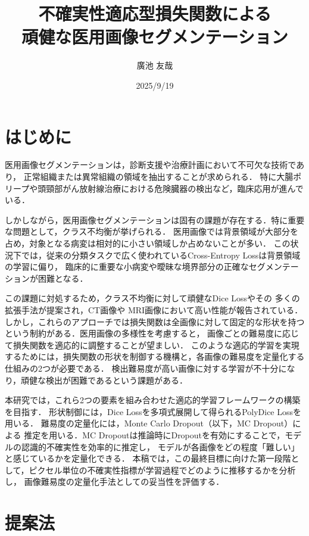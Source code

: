 \documentclass[10pt, a4paper, twocolumn]{jarticle}
\title{不確実性適応型損失関数による \\
頑健な医用画像セグメンテーション}
\author{廣池 友哉}
\affiliation{広島大学 大学院先進理工系科学研究科 情報科学プログラム}
\date{2025/9/19}
\begin{document}
\maketitle


\section{はじめに}
医用画像セグメンテーションは，診断支援や治療計画において不可欠な技術であり，
正常組織または異常組織の領域を抽出することが求められる．
特に大腸ポリープ\cite{ji2022video}や頭頸部がん放射線治療における危険臓器\cite{maleki2020machine}の検出など，臨床応用が進んでいる．

しかしながら，医用画像セグメンテーションは固有の課題が存在する．特に重要な問題として，クラス不均衡が挙げられる．
医用画像では背景領域が大部分を占め，対象となる病変は相対的に小さい領域しか占めないことが多い．
この状況下では，従来の分類タスクで広く使われているCross-Entropy Loss\cite{long2015fully}は背景領域の学習に偏り，
臨床的に重要な小病変や曖昧な境界部分の正確なセグメンテーションが困難となる．

この課題に対処するため，クラス不均衡に対して頑健なDice Loss\cite{milletari2016v}やその
多くの拡張手法が提案され，CT画像\cite{zhu2019anatomynet, 9109297}や
MRI画像\cite{KATO2024107695}において高い性能が報告されている．
しかし，これらのアプローチでは損失関数は全画像に対して固定的な形状を持つという制約がある．医用画像の多様性を考慮すると，
画像ごとの難易度に応じて損失関数を適応的に調整することが望ましい．
このような適応的学習を実現するためには，損失関数の形状を制御する機構と，各画像の難易度を定量化する仕組みの2つが必要である．
検出難易度が高い画像に対する学習が不十分になり，頑健な検出が困難であるという課題がある．

本研究では，これら2つの要素を組み合わせた適応的学習フレームワークの構築を目指す．
形状制御には，Dice Lossを多項式展開して得られるPolyDice Lossを用いる．
難易度の定量化には，Monte Carlo Dropout\cite{pmlr-v48-gal16}（以下，MC Dropout）による
推定を用いる．MC Dropoutは推論時にDropoutを有効にすることで，モデルの認識的不確実性を効率的に推定し，
モデルが各画像をどの程度「難しい」と感じているかを定量化できる．
本稿では，この最終目標に向けた第一段階として，ピクセル単位の不確実性指標が学習過程でどのように推移するかを分析し，
画像難易度の定量化手法としての妥当性を評価する．
\section{提案法}
\end{document}
